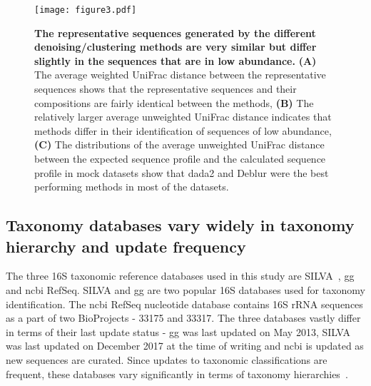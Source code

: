   \begin{figure}
    \centering
    \texttt{[image: figure3.pdf]}
    \caption{
      \textbf{The representative sequences generated by the different denoising/clustering methods are very similar but differ slightly in the sequences that are in low abundance.}
      \textbf{(A)} The average weighted UniFrac distance between the representative sequences shows that the representative sequences and their compositions are fairly identical between the methods,
      \textbf{(B)} The relatively larger average unweighted UniFrac distance indicates that methods differ in their identification of sequences of low abundance,
      \textbf{(C)} The distributions of the average unweighted UniFrac distance between the expected sequence profile and the calculated sequence profile in mock datasets show that dada2 and Deblur were the best performing methods in most of the datasets.
    }
    \label{fig:figure3}
  \end{figure}

  \FloatBarrier

  \subsection*{Taxonomy databases vary widely in taxonomy hierarchy and update frequency}

  The three 16S taxonomic reference databases used in this study are SILVA~\cite{Quast2012}, \ac{gg}~\cite{DeSantis2006} and \ac{ncbi} RefSeq.
  SILVA and \ac{gg} are two popular 16S databases used for taxonomy identification.
  The \ac{ncbi} RefSeq nucleotide database contains 16S rRNA sequences as a part of two BioProjects - 33175 and 33317.
  The three databases vastly differ in terms of their last update status - \ac{gg} was last updated on May 2013, SILVA was last updated on December 2017 at the time of writing and \ac{ncbi} is updated as new sequences are curated.
  Since updates to taxonomic classifications are frequent, these databases vary significantly in terms of taxonomy hierarchies~\cite{Balvociute2017}.

